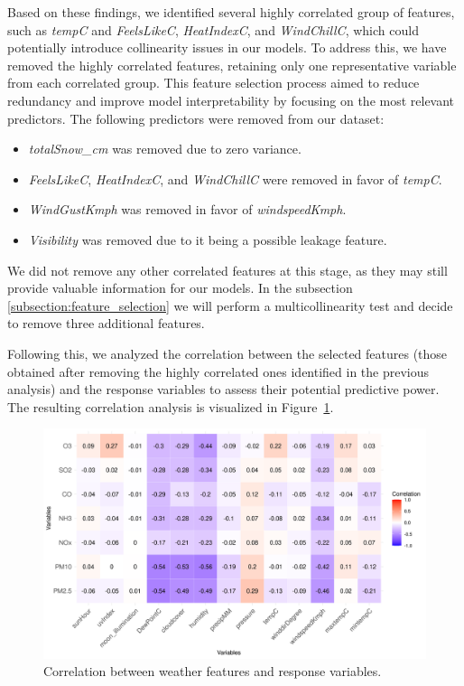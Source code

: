 \documentclass[twoside,11pt]{article}
\begin{document}
Based on these findings, we identified several highly correlated group of features, such as \textit{tempC} and \textit{FeelsLikeC}, \textit{HeatIndexC}, and \textit{WindChillC}, which could potentially introduce collinearity issues in our models. To address this, we have removed the highly correlated features, retaining only one representative variable from each correlated group. This feature selection process aimed to reduce redundancy and improve model interpretability by focusing on the most relevant predictors. The following predictors were removed from our dataset:

\begin{itemize}
    \item \textit{totalSnow\_cm} was removed due to zero variance.
    \item \textit{FeelsLikeC}, \textit{HeatIndexC}, and \textit{WindChillC} were removed in favor of \textit{tempC}.
    \item \textit{WindGustKmph} was removed in favor of \textit{windspeedKmph}.
    \item \textit{Visibility} was removed due to it being a possible leakage feature.
\end{itemize}

We did not remove any other correlated features at this stage, as they may still provide valuable information for our models. In the subsection \ref{subsection:feature_selection} we will perform a multicollinearity test and decide to remove three additional features.

Following this, we analyzed the correlation between the selected features (those obtained after removing the highly correlated ones identified in the previous analysis) and the response variables to assess their potential predictive power. The resulting correlation analysis is visualized in Figure~\ref{fig:feature_response_correlation}.

\begin{figure}[H]
  \centering
  \includegraphics[width=\textwidth]{assets/feature-response-correlation.png}
  \caption{Correlation between weather features and response variables.}
  \label{fig:feature_response_correlation}
\end{figure}
\end{document}
